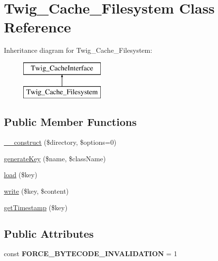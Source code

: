 \hypertarget{classTwig__Cache__Filesystem}{}\section{Twig\+\_\+\+Cache\+\_\+\+Filesystem Class Reference}
\label{classTwig__Cache__Filesystem}
Inheritance diagram for Twig\+\_\+\+Cache\+\_\+\+Filesystem\+:\begin{figure}[H]
\begin{center}
\leavevmode
\includegraphics[height=2.000000cm]{classTwig__Cache__Filesystem}
\end{center}
\end{figure}
\subsection*{Public Member Functions}
\begin{DoxyCompactItemize}
\item 
\hyperlink{classTwig__Cache__Filesystem_a3f3d48d26a40557344529b84ef333a57}{\+\_\+\+\_\+construct} (\$directory, \$options=0)
\item 
\hyperlink{classTwig__Cache__Filesystem_a300dd51e84f484157ef8cd1246dcc623}{generate\+Key} (\$name, \$class\+Name)
\item 
\hyperlink{classTwig__Cache__Filesystem_a772fd34e8e1716256129d722f5c75024}{load} (\$key)
\item 
\hyperlink{classTwig__Cache__Filesystem_ac04cdf4ac5b58cd327a77109fc93796f}{write} (\$key, \$content)
\item 
\hyperlink{classTwig__Cache__Filesystem_abecdc7c0ad5e2b0c484fcc45b6d59f4b}{get\+Timestamp} (\$key)
\end{DoxyCompactItemize}
\subsection*{Public Attributes}
\begin{DoxyCompactItemize}
\item 
const {\bfseries F\+O\+R\+C\+E\+\_\+\+B\+Y\+T\+E\+C\+O\+D\+E\+\_\+\+I\+N\+V\+A\+L\+I\+D\+A\+T\+I\+ON} = 1\hypertarget{classTwig__Cache__Filesystem_aa93db3981139f40bf8a578166f57cb99}{}\label{classTwig__Cache__Filesystem_aa93db3981139f40bf8a578166f57cb99}

\end{DoxyCompactItemize}


